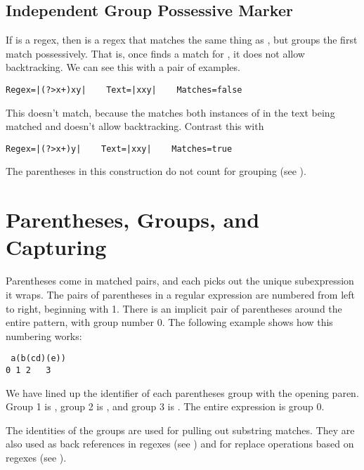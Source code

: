 \subsection{Independent Group Possessive Marker}\label{section:group-possess-marker}

If  is a regex, then  is a regex that
matches the same thing as , but groups the first match
possessively.  That is, once  finds a match
for , it does not allow backtracking.   We can see this
with a pair of examples.
%
\begin{verbatim}
Regex=|(?>x+)xy|    Text=|xxy|    Matches=false
\end{verbatim}
%
This doesn't match, because the  matches both
instances of  in the text being matched and doesn't
allow backtracking.  Contrast this with
%
\begin{verbatim}
Regex=|(?>x+)y|    Text=|xxy|    Matches=true
\end{verbatim}

The parentheses in this construction do not count for grouping
(see ).


\section{Parentheses, Groups, and Capturing}\label{section:regex-groups}

Parentheses come in matched pairs, and
each picks out the unique subexpression  it wraps.
The pairs of parentheses in a regular expression are numbered
from left to right, beginning with 1. 
There is an implicit pair of parentheses around the entire pattern, 
with group number 0.  
The following example shows how this numbering works:
%
\begin{verbatim}
 a(b(cd)(e))
0 1 2   3
\end{verbatim}
%
We have lined up the identifier of each parentheses group with the opening paren.
Group 1 is ,
group 2 is , and group 3 is .  
The entire expression is group 0.

The identities of the groups are used for pulling out substring matches.
They are also used as back references in regexes (see
) and for replace operations
based on regexes (see
). 

